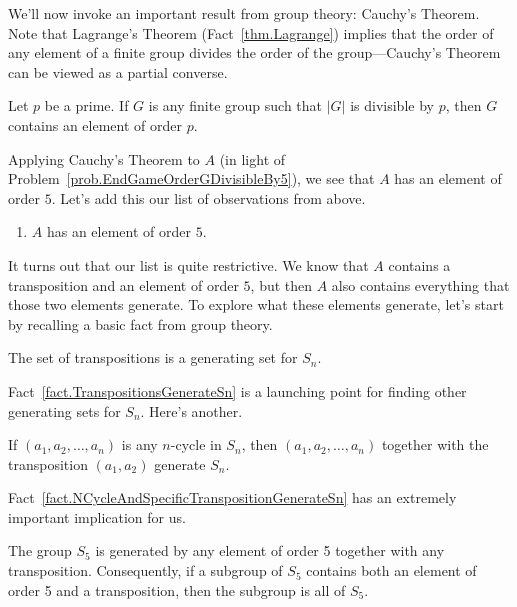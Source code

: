 We'll now invoke an important result from group theory: Cauchy's Theorem. Note that Lagrange's Theorem (Fact~\ref{thm.Lagrange}) implies that the order of any element of a finite group  divides the order of the group---Cauchy's Theorem can be viewed as a partial converse.

\begin{fact}
Let $p$ be a prime. If $G$ is any finite group such that $|G|$ is divisible by $p$, then  $G$ contains an element of order $p$.
\end{fact}

Applying Cauchy's Theorem to $A$ (in light of Problem~\ref{prob.EndGameOrderGDivisibleBy5}), we see that $A$ has an element of order $5$. Let's add this our list of observations from above.

\begin{enumerate}[start = 3, label = \textbf{\Roman*.}]
\item $A$ has an element of order $5$.
\end{enumerate}

It turns out that our list is quite restrictive. We know that $A$ contains a transposition and an element of order $5$, but then $A$ also contains everything that those two elements generate. To explore what these elements generate, let's start by recalling  a basic fact from group theory. 

\begin{fact}\label{fact.TranspositionsGenerateSn}
The set of transpositions is a generating set for $S_n$. 
\end{fact}

Fact~\ref{fact.TranspositionsGenerateSn} is a launching point for finding other generating sets for $S_n$. Here's another.

\begin{fact}\label{fact.NCycleAndSpecificTranspositionGenerateSn}
If $(a_1,a_2,\ldots,a_n)$ is any $n$-cycle in $S_n$, then $(a_1,a_2,\ldots,a_n)$ together with the transposition $(a_1,a_2)$ generate $S_n$.
\end{fact}

Fact~\ref{fact.NCycleAndSpecificTranspositionGenerateSn} has an extremely important implication for us.

\begin{theorem}\label{thm.TranspositionAndOrder5GenerateS5}
The group $S_5$ is generated by any element of order 5 together with any transposition. Consequently, if a subgroup of $S_5$ contains both an element of order 5 and a transposition, then the subgroup is all of $S_5$.
\end{theorem}

